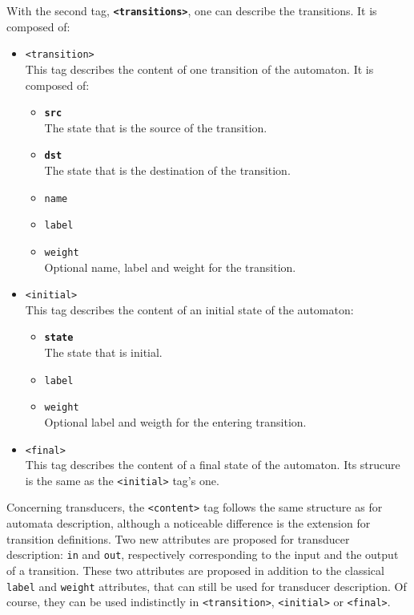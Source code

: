 \documentclass[a4paper]{llncs}
\def\contenttag{\texttt{<content>}}
\def\transitionstag{\texttt{<transitions>}}
\def\transitiontag{\texttt{<transition>}}
\def\finaltag{\texttt{<final>}}
\def\initialtag{\texttt{<initial>}}
\begin{document}
With the second tag, \textbf{\transitionstag{}}, one can describe the transitions. It is composed of:
\begin{itemize}
\item \transitiontag{}\\
  This tag describes the content of one transition of the automaton. It is
  composed of:
\begin{itemize}
  \item \texttt{\textbf{src}}\\
    The state that is the source of the transition.
  \item \texttt{\textbf{dst}}\\
    The state that is the destination of the transition.
  \item \texttt{name}
  \item \texttt{label}
  \item \texttt{weight}\\
    Optional name, label and weight for the transition.
\end{itemize}
\item \initialtag{}\\
  This tag describes the content of an initial state of the automaton:
\begin{itemize}
  \item \texttt{\textbf{state}}\\
    The state that is initial.
  \item \texttt{label}
  \item \texttt{weight}\\
    Optional label and weigth for the entering transition.
\end{itemize}
\item \finaltag{}\\
  This tag describes the content of a final state of the automaton. Its
strucure is the same as the \initialtag{} tag's one.
\end{itemize}

Concerning transducers, the \contenttag{} tag follows the same structure as
for automata description, although a noticeable difference is the extension for
transition definitions. Two new attributes are proposed for transducer
description: \verb|in| and \verb|out|, respectively corresponding to
the input and the output of a transition. These two attributes are
proposed in addition to the classical \verb|label| and \verb|weight|
attributes, that can still be used for transducer description. Of course, they
can be used indistinctly in \transitiontag{}, \initialtag{} or \finaltag{}. \\
\end{document}
